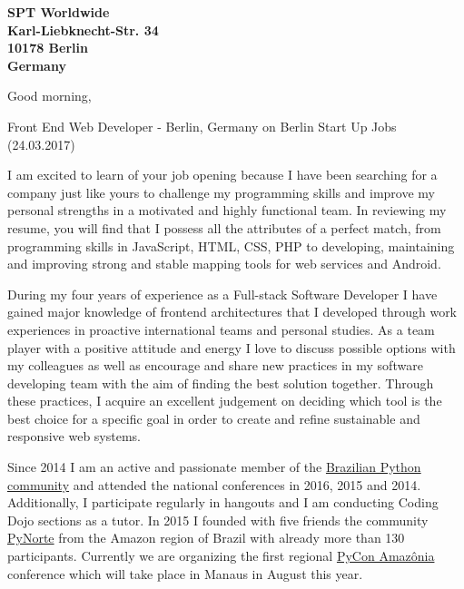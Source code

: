 \documentclass[a4paper]{joaosoares-letter}
\begin{document}
\longindentation=0pt


\begin{letter}{\bfseries SPT Worldwide\\Karl-Liebknecht-Str. 34\\10178 Berlin\\Germany}


\date{Belém, \today}

\opening{Good morning,}{Front End Web Developer - Berlin, Germany on Berlin Start Up Jobs (24.03.2017)}

I am excited to learn of your job opening because I have been searching for a company just like yours to challenge my programming skills and improve my personal strengths in a motivated and highly functional team. In reviewing my resume, you will find that I possess all the attributes of a perfect match, from programming skills in JavaScript, HTML, CSS, PHP to developing, maintaining and improving strong and stable mapping tools for web services and Android.

During my four years of experience as a Full-stack Software Developer I have gained major knowledge of frontend architectures that I developed through work experiences in proactive international teams and personal studies. As a team player with a positive attitude and energy I love to discuss possible options with my colleagues as well as encourage and share new practices in my software developing team with the aim of finding the best solution together. Through these practices, I acquire an excellent judgement on deciding which tool is the best choice for a specific goal in order to create and refine sustainable and responsive web systems.

Since 2014 I am an active and passionate member of the \href{http://python.org.br}{Brazilian Python community} and attended the national conferences in 2016, 2015 and 2014. Additionally, I participate regularly in hangouts and I am conducting Coding Dojo sections as a tutor. In 2015 I founded with five friends the community \href{http://pynorte.python.org.br}{PyNorte} from the Amazon region of Brazil with already more than 130 participants. Currently we are organizing the first regional \href{http://amazonia.python.org.br/}{PyCon Amazônia} conference which will take place in Manaus in August this year.


\end{letter}
\end{document}
